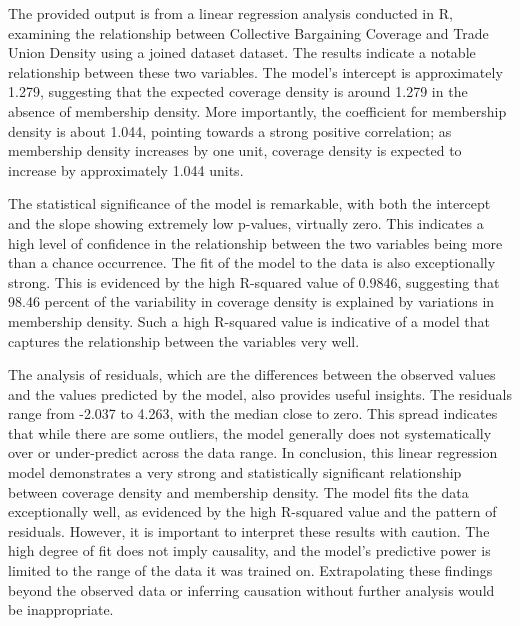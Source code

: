 \documentclass[11pt]{article}\usepackage[]{graphicx}\usepackage[]{xcolor}
\begin{document}
The provided output is from a linear regression analysis conducted in R, examining the relationship between Collective Bargaining Coverage and Trade Union Density using a joined dataset dataset. The results indicate a notable relationship between these two variables. The model's intercept is approximately 1.279, suggesting that the expected coverage density is around 1.279 in the absence of membership density. More importantly, the coefficient for membership density is about 1.044, pointing towards a strong positive correlation; as membership density increases by one unit, coverage density is expected to increase by approximately 1.044 units.

The statistical significance of the model is remarkable, with both the intercept and the slope showing extremely low p-values, virtually zero. This indicates a high level of confidence in the relationship between the two variables being more than a chance occurrence. The fit of the model to the data is also exceptionally strong. This is evidenced by the high R-squared value of 0.9846, suggesting that 98.46 percent of the variability in coverage density is explained by variations in membership density. Such a high R-squared value is indicative of a model that captures the relationship between the variables very well.

The analysis of residuals, which are the differences between the observed values and the values predicted by the model, also provides useful insights. The residuals range from -2.037 to 4.263, with the median close to zero. This spread indicates that while there are some outliers, the model generally does not systematically over or under-predict across the data range. In conclusion, this linear regression model demonstrates a very strong and statistically significant relationship between coverage density and membership density. The model fits the data exceptionally well, as evidenced by the high R-squared value and the pattern of residuals. However, it is important to interpret these results with caution. The high degree of fit does not imply causality, and the model's predictive power is limited to the range of the data it was trained on. Extrapolating these findings beyond the observed data or inferring causation without further analysis would be inappropriate.
\end{document}
